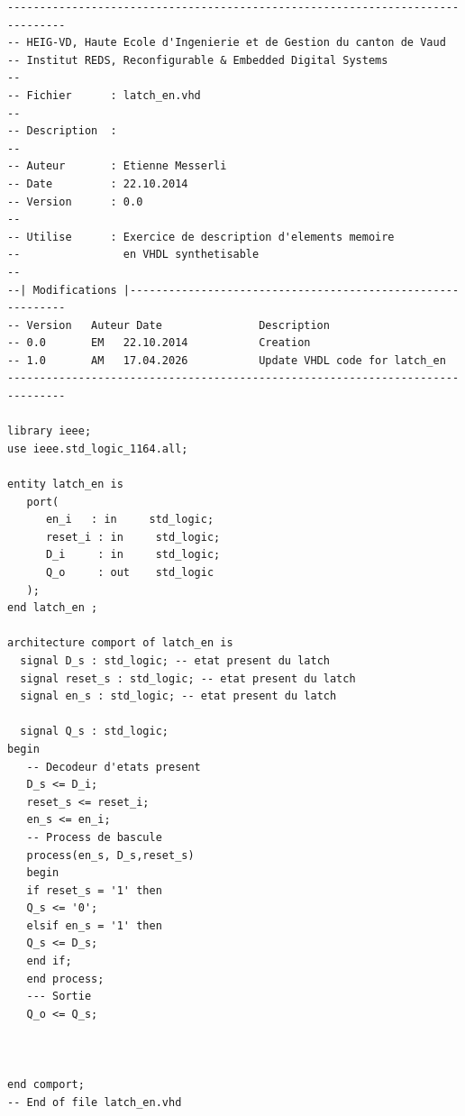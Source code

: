 \begin{verbatim}
-------------------------------------------------------------------------------
-- HEIG-VD, Haute Ecole d'Ingenierie et de Gestion du canton de Vaud
-- Institut REDS, Reconfigurable & Embedded Digital Systems
--
-- Fichier      : latch_en.vhd
--
-- Description  : 
-- 
-- Auteur       : Etienne Messerli
-- Date         : 22.10.2014
-- Version      : 0.0
-- 
-- Utilise      : Exercice de description d'elements memoire
--                en VHDL synthetisable
-- 
--| Modifications |------------------------------------------------------------
-- Version   Auteur Date               Description
-- 0.0       EM   22.10.2014           Creation
-- 1.0       AM   17.04.2026           Update VHDL code for latch_en
-------------------------------------------------------------------------------

library ieee;
use ieee.std_logic_1164.all;

entity latch_en is
   port( 
      en_i   : in     std_logic;
      reset_i : in     std_logic;
      D_i     : in     std_logic;
      Q_o     : out    std_logic
   );
end latch_en ;

architecture comport of latch_en is
  signal D_s : std_logic; -- etat present du latch
  signal reset_s : std_logic; -- etat present du latch
  signal en_s : std_logic; -- etat present du latch
  
  signal Q_s : std_logic;
begin
   -- Decodeur d'etats present
   D_s <= D_i;
   reset_s <= reset_i;
   en_s <= en_i;
   -- Process de bascule
   process(en_s, D_s,reset_s)
   begin
   if reset_s = '1' then
   Q_s <= '0';
   elsif en_s = '1' then
   Q_s <= D_s;
   end if;
   end process;
   --- Sortie
   Q_o <= Q_s;


  
end comport;
-- End of file latch_en.vhd
\end{verbatim}
\newpage
